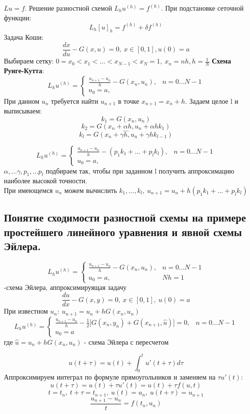 \documentclass[a4paper]{article}
\begin{document}
$Lu=f$. Решение разностной схемой $L_hu^{(h)}=f^{(h)}$. При подстановке сеточной функции: $$ L_h[u]_h=f^{(h)}+\delta f^{(h)} $$
Задача Коши: $$ \frac{dx}{du}-G(x,u)=0,\ x\in[0,1],u(0)=a $$
Выбираем сетку: $0=x_0<x_1<\ldots<x_{N-1}<x_N=1, \ x_n=nh, h=\frac{1}{N}$ 
\textbf{Схема Рунге-Кутта}:\\
	$$L_hu^{(h)} = \begin{cases}
	\frac{u_{n+1}-u_n}{h} - G(x_n,u_n), & n=0\ldots N-1\\
	u_0=a, & \end{cases}$$
При данном $u_n$ требуется найти $u_{n+1}$ в точке $x_{n+1}=x_n+h$. Задаем целое l и выписываем:
$$ k_1=G(x_n,u_n)$$
$$ k_2=G(x_n + \alpha h, u_n+\alpha hk_1) $$
$$ \ldots $$
$$ k_l = G(x_n + \gamma h, u_n + \gamma hk_{l-1}) $$

$$L_hu^{(h)} = \begin{cases}
	\frac{u_{n+1}-u_n}{h} - (p_1 k_1 + \ldots + p_l k_l), & n=0\ldots N-1\\
	u_0=a, & \end{cases}$$
$\alpha, \ldots \gamma, p_1, \ldots p_l$ подбираем так, чтобы при заданном l получить аппроксимацию наиболее высокой точности. \\
При имеющемся $u_n$ можем вычислить $k_1, \ldots, k_l, \ u_{n+1}=u_n+h(p_1k_1 + \ldots + p_l k_l)$
\subsection{Понятие сходимости разностной схемы на примере простейшего линейного уравнения и явной схемы Эйлера.}
$$ L_hu^{(h)} = \begin{cases}
	\frac{u_{n+1}-u_n}{h} - G(x_n,u_n), & n=0\ldots N-1\\
	u_0=a, & Nh=1 \end{cases}$$
	-схема Эйлера, аппроксимируящая задачу $$ \frac{du}{dx} - G(x,y)=0, \ x \in [0,1], \ u(0)=a $$
	При известном $u_n: \ u_{n+1}=u_n+hG(x_n,u_n)$
$$ L_hu^{(h)} = \begin{cases}
	\frac{u_{n+1}-u_n}{h} - \frac{1}{2}\big[G(x_n,y_n)+G(x_{n+1}, \hat{u}) \big] = 0, & n=0\ldots N-1\\
	u_0=a \end{cases}$$
	где $\hat{u}=u_n+hG(x_n,u_n)$ - схема Эйлера с пересчетом

$$ u(t+\tau) = u(t) + \int_{0}^t u'(t+\tau) d\tau $$
Аппроксимируем интеграл по формуле прямоугольников и заменяем на $\tau u'(t)$:
$$ u(t+\tau)=u(t)+\tau u'(t) = u(t)+\tau f(u,t)$$
$$ t=t_n, \ t+\tau = t_{n+1}, \ u(t)=u_n, \ u(t+\tau) = u_{n+1}$$
$$ \frac{u_{n+1}-u_n}{t} = f(t_n,u_n)$$
\end{document}
